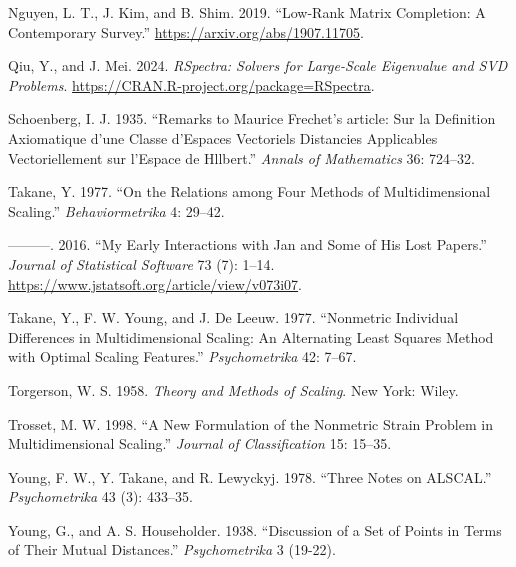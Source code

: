 \documentclass[
  12pt,
  letterpaper,
  DIV=11,
  numbers=noendperiod]{scrartcl}
\newlength{\cslhangindent}
\newenvironment{CSLReferences}[2] %
 {\begin{list}{}{%
  \setlength{\itemindent}{0pt}
  \setlength{\leftmargin}{0pt}
  \setlength{\parsep}{0pt}
  \ifodd #1
   \setlength{\leftmargin}{\cslhangindent}
   \setlength{\itemindent}{-1\cslhangindent}
  \fi
  \setlength{\itemsep}{#2\baselineskip}}}
 {\end{list}}
\begin{document}
\begin{CSLReferences}{1}{0}
Nguyen, L. T., J. Kim, and B. Shim. 2019. {``{Low-Rank Matrix
Completion: A Contemporary Survey}.''}
\url{https://arxiv.org/abs/1907.11705}.

Qiu, Y., and J. Mei. 2024. \emph{{RSpectra: Solvers for Large-Scale
Eigenvalue and SVD Problems}}.
\url{https://CRAN.R-project.org/package=RSpectra}.

Schoenberg, I. J. 1935. {``{Remarks to Maurice Frechet's article: Sur la
Definition Axiomatique d'une Classe d'Espaces Vectoriels Distancies
Applicables Vectoriellement sur l'Espace de Hllbert}.''} \emph{Annals of
Mathematics} 36: 724--32.

Takane, Y. 1977. {``{On the Relations among Four Methods of
Multidimensional Scaling}.''} \emph{Behaviormetrika} 4: 29--42.

---------. 2016. {``{My Early Interactions with Jan and Some of His Lost
Papers}.''} \emph{Journal of Statistical Software} 73 (7): 1--14.
\url{https://www.jstatsoft.org/article/view/v073i07}.

Takane, Y., F. W. Young, and J. De Leeuw. 1977. {``Nonmetric Individual
Differences in Multidimensional Scaling: An Alternating Least Squares
Method with Optimal Scaling Features.''} \emph{Psychometrika} 42: 7--67.

Torgerson, W. S. 1958. \emph{{Theory and Methods of Scaling}}. New York:
Wiley.

Trosset, M. W. 1998. {``A New Formulation of the Nonmetric Strain
Problem in Multidimensional Scaling.''} \emph{Journal of Classification}
15: 15--35.

Young, F. W., Y. Takane, and R. Lewyckyj. 1978. {``{Three Notes on
ALSCAL}.''} \emph{Psychometrika} 43 (3): 433--35.

Young, G., and A. S. Householder. 1938. {``{Discussion of a Set of
Points in Terms of Their Mutual Distances}.''} \emph{Psychometrika} 3
(19-22).

\end{CSLReferences}
\end{document}
